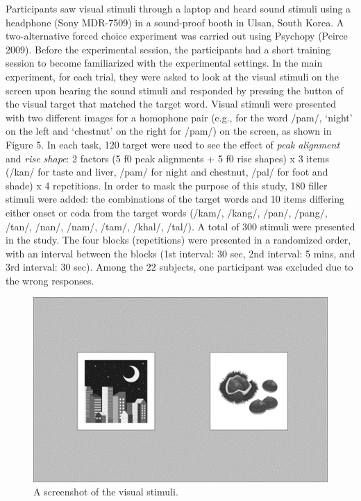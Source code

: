 \documentclass[
  man,floatsintext]{apa6}
\begin{document}
Participants saw visual stimuli through a laptop and heard sound stimuli using a headphone (Sony MDR-7509) in a sound-proof booth in Ulsan, South Korea. A two-alternative forced choice experiment was carried out using Psychopy (Peirce 2009). Before the experimental session, the participants had a short training session to become familiarized with the experimental settings. In the main experiment, for each trial, they were asked to look at the visual stimuli on the screen upon hearing the sound stimuli and responded by pressing the button of the visual target that matched the target word. Visual stimuli were presented with two different images for a homophone pair (e.g., for the word /pam/, `night' on the left and `chestnut' on the right for /pam/) on the screen, as shown in Figure 5. In each task, 120 target were used to see the effect of \emph{peak alignment} and \emph{rise shape}: 2 factors (5 f0 peak alignments + 5 f0 rise shapes) x 3 items (/kan/ for taste and liver, /pam/ for night and chestnut, /pal/ for foot and shade) x 4 repetitions. In order to mask the purpose of this study, 180 filler stimuli were added: the combinations of the target words and 10 items differing either onset or coda from the target words (/kam/, /kang/, /pan/, /pang/, /tan/, /nan/, /nam/, /tam/, /khal/, /tal/). A total of 300 stimuli were presented in the study. The four blocks (repetitions) were presented in a randomized order, with an interval between the blocks (1st interval: 30 sec, 2nd interval: 5 mins, and 3rd interval: 30 sec). Among the 22 subjects, one participant was excluded due to the wrong responses.

\begin{figure}[H]

{\centering \includegraphics[width=1\linewidth]{images/picture5} 

}

\caption{A screenshot of the visual stimuli.}\label{fig:picture5}
\end{figure}
\end{document}
